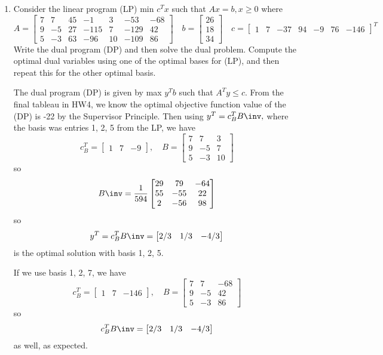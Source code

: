 \documentclass{article}
\begin{document}
\begin{enumerate}
\begin{enumerate}[a)]
\begin{soln}
				\end{soln}

		\end{enumerate}

	\item Consider the linear program (LP) min $c^T x$ such that $Ax=b, x\ge 0$ where \[ A=\begin{bmatrix}
				7 & 7 & 45 & -1 & 3 & -53 & -68 \\
				9 & -5 & 27 & -115 & 7 & -129 & 42 \\
				5 & -3 & 63 & -96 & 10 & -109 & 86
			\end{bmatrix}\quad b=\begin{bmatrix}
				26 \\ 18 \\ 34
			\end{bmatrix}\quad c=\begin{bmatrix}
				1 & 7 & -37 & 94 & -9 & 76 & -146
		\end{bmatrix}^T\] Write the dual program (DP) and then solve the dual problem. Compute the optimal dual variables using one of the optimal bases for (LP), and then repeat this for the other optimal basis.
		\begin{soln}
			The dual program (DP) is given by max $y^T b$ such that $A^T y\le c.$ From the final tableau in HW4, we know the optimal objective function value of the (DP) is -22 by the Supervisor Principle. Then using $y^T=c_B^T B\inv,$ where the basis was entries 1, 2, 5 from the LP, we have \[c_B^T = \begin{bmatrix}
					1 & 7 & -9
				\end{bmatrix}, \quad B=\begin{bmatrix}
					7 & 7 & 3 \\
					9 & -5 & 7 \\
					5 & -3 & 10
			\end{bmatrix}\] so \[B\inv = \frac{1}{594}\begin{bmatrix}
					29 & 79 & -64 \\
					55 & -55 & 22 \\
					2 & -56 & 98
			\end{bmatrix}\] so \[y^T=c_B^T B\inv = \begin{bmatrix}
					2/3 & 1/3 & -4/3
			\end{bmatrix}\] is the optimal solution with basis 1, 2, 5.

			If we use basis 1, 2, 7, we have \[c_B^T = \begin{bmatrix}
					1 & 7 & -146
				\end{bmatrix}, \quad B=\begin{bmatrix}
					7 & 7 & -68 \\
					9 & -5 & 42 \\
					5 & -3 & 86
			\end{bmatrix}\] so \[c_B^T B\inv = \begin{bmatrix}
					2/3 & 1/3 & -4/3
			\end{bmatrix}\] as well, as expected.
			
		\end{soln}

\end{enumerate}
\end{document}
